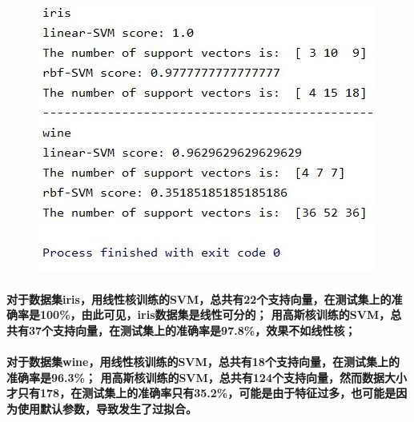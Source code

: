 \documentclass[UTF8]{ctexart}
\begin{document}
\paragraph{}
\begin{figure}[htp]
    \includegraphics{svm.jpg}
\end{figure}
\paragraph{对于数据集iris，用线性核训练的SVM，总共有22个支持向量，在测试集上的准确率是100\%，由此可见，iris数据集是线性可分的；
用高斯核训练的SVM，总共有37个支持向量，在测试集上的准确率是97.8\%，效果不如线性核；}
\paragraph{对于数据集wine，用线性核训练的SVM，总共有18个支持向量，在测试集上的准确率是96.3\%；
用高斯核训练的SVM，总共有124个支持向量，然而数据大小才只有178，在测试集上的准确率只有35.2\%，可能是由于特征过多，也可能是因为使用默认参数，导致发生了过拟合。}
\end{document}
